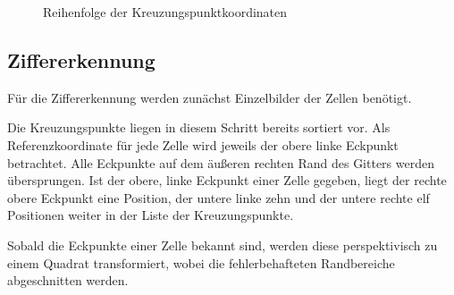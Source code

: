 \begin{figure}[H]
    \hfill
    \caption{Reihenfolge der Kreuzungspunktkoordinaten}
\end{figure}


\subsection{Ziffererkennung}
Für die Ziffererkennung werden zunächst Einzelbilder der Zellen benötigt.

Die Kreuzungspunkte liegen in diesem Schritt bereits sortiert vor.
Als Referenzkoordinate für jede Zelle wird jeweils der obere linke Eckpunkt betrachtet.
Alle Eckpunkte auf dem äußeren rechten Rand des Gitters werden übersprungen.
Ist der obere, linke Eckpunkt einer Zelle gegeben, liegt der rechte obere Eckpunkt eine Position, der untere linke zehn und der untere rechte elf Positionen weiter in der Liste der Kreuzungspunkte.

Sobald die Eckpunkte einer Zelle bekannt sind, werden diese perspektivisch zu einem Quadrat transformiert, wobei die fehlerbehafteten Randbereiche abgeschnitten werden.

